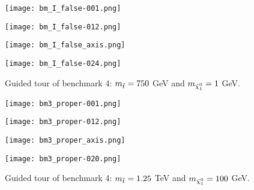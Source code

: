\begin{figure}[htbp]
\centering
  \begin{minipage}[htbp]{0.49\textwidth}
    \centering
    \texttt{[image: bm\_I\_false-001.png]}
  \end{minipage}
  \begin{minipage}[htbp]{0.49\textwidth}
    \centering
    \texttt{[image: bm\_I\_false-012.png]}
  \end{minipage}
  \begin{minipage}[htbp]{0.49\textwidth}
    \centering
    \texttt{[image: bm\_I\_false\_axis.png]}
  \end{minipage}
  \begin{minipage}[htbp]{0.49\textwidth}
    \centering
    \texttt{[image: bm\_I\_false-024.png]}
  \end{minipage}
  \caption{Guided tour of benchmark 4: $m_{\Tilde{t}} = 750$ GeV and $m_{\Tilde{\chi}_1^0} = 1$ GeV. }
  \label{fig:bmInF_tour}
\end{figure}



\begin{figure}[htbp]
\centering
  \begin{minipage}[htbp]{0.49\textwidth}
    \centering
    \texttt{[image: bm3\_proper-001.png]}
  \end{minipage}
  \begin{minipage}[htbp]{0.49\textwidth}
    \centering
    \texttt{[image: bm3\_proper-012.png]}
  \end{minipage}
  \begin{minipage}[htbp]{0.49\textwidth}
    \centering
    \texttt{[image: bm3\_proper\_axis.png]}
  \end{minipage}
  \begin{minipage}[htbp]{0.49\textwidth}
    \centering
    \texttt{[image: bm3\_proper-020.png]}
  \end{minipage}
  \caption{Guided tour of benchmark 4: $m_{\Tilde{t}} = 1.25$ TeV and $m_{\Tilde{\chi}_1^0} = 100$ GeV. }
  \label{fig:bm3_tour}
\end{figure}

